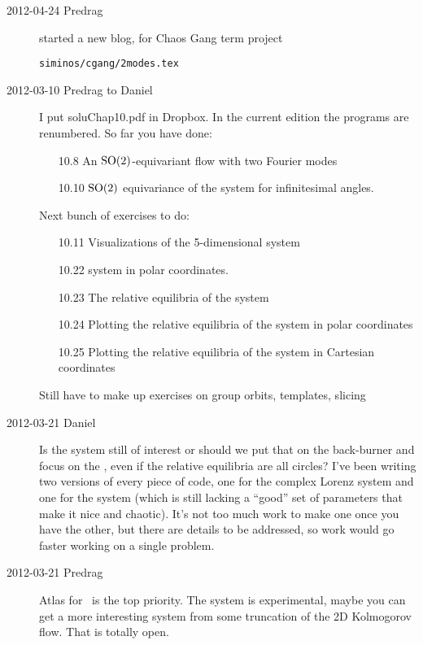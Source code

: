 \begin{description}
\item[2012-04-24 Predrag]
started a new blog, for Chaos Gang term project

\texttt{siminos/cgang/2modes.tex}

\item[2012-03-10 Predrag to Daniel] I put soluChap10.pdf in Dropbox. In
the current edition the programs are renumbered. So far you have done:
\begin{itemize}
  \item[10.8]  An $\textrm{SO}(2)$-equivariant flow with two Fourier modes
  \item[10.10] $\textrm{SO}(2)$ equivariance of the {\twoMode} system
           for infinitesimal angles.
\end{itemize}
Next bunch of exercises to do:
\begin{itemize}
  \item[10.11] Visualizations of the 5-dimensional {\twoMode} system
  \item[10.22] {\twoMode} system in polar coordinates.
  \item[10.23] The relative equilibria of the {\twoMode} system
  \item[10.24] Plotting the relative equilibria of
           the {\twoMode} system in polar coordinates
  \item[10.25] Plotting the relative equilibria of
           the {\twoMode} system in Cartesian coordinates
\end{itemize}

Still have to make up exercises on group orbits, templates, slicing

\item[2012-03-21 Daniel]
Is the {\twoMode} system still of interest or should we put that on the
back-burner and focus on the \cLe, even if the relative equilibria are
all circles? I've been writing two versions of every piece of code, one
for the complex Lorenz system and one for the {\twoMode} system (which is
still lacking a ``good'' set of parameters that make it nice and
chaotic). It's not too much work to make one once you have the other, but
there are details to be addressed, so work would go faster working on a
single problem.

\item[2012-03-21 Predrag]
Atlas for \cLe\ is the top priority. The {\twoMode} system is experimental,
maybe you can get a more interesting system from some truncation of the
2D Kolmogorov flow. That is totally open.


\end{description}
